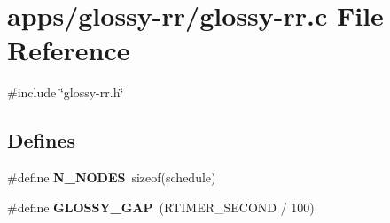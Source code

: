 \hypertarget{glossy-rr_8c}{
\section{apps/glossy-\/rr/glossy-\/rr.c File Reference}
\label{glossy-rr_8c}
}
{\ttfamily \#include \char`\"{}glossy-\/rr.h\char`\"{}}\par
\subsection*{Defines}
\begin{DoxyCompactItemize}
\item 
\hypertarget{group__glossy-test-variables_ga16c19de9b8eca127fb6d5dad6b43aa49}{
\#define {\bfseries N\_\-NODES}~sizeof(schedule)}
\label{group__glossy-test-variables_ga16c19de9b8eca127fb6d5dad6b43aa49}

\item 
\hypertarget{group__glossy-test-variables_ga07bdfac120f7a9f4dd80ba96307262f6}{
\#define {\bfseries GLOSSY\_\-GAP}~(RTIMER\_\-SECOND / 100)}
\label{group__glossy-test-variables_ga07bdfac120f7a9f4dd80ba96307262f6}

\end{DoxyCompactItemize}
